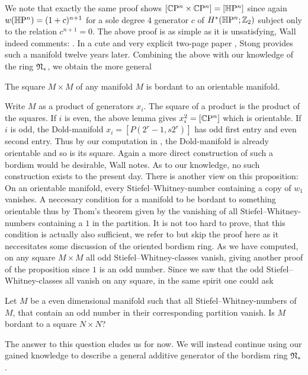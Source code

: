 \endprf
We note that exactly the same proof shows $[\mathbb{C}\mathrm{P}^n\times\mathbb{C}\mathrm{P}^n] = [\mathbb{H}\mathrm{P}^n]$ since again $w(\mathbb{H}\mathrm{P}^n) = (1 + c)^{n+1}$ for a sole degree $4$ generator $c$ of $H^\ast(\mathbb{H}\mathrm{P}^n;\mathbb{Z}_2)$ subject only to the relation $c^{n+1}=0$.
The above proof is as simple as it is unsatisfying,
Wall indeed comments:
.
In a cute and very explicit two-page paper \cite{stong:cob}, Stong provides such a manifold twelve years later.
Combining the above with our knowledge of the ring $\mathfrak{N}_\ast$, we obtain the more general
\begin{thesisprop}
    The square $M\times M$ of any manifold $M$ is bordant to an orientable manifold.
\end{thesisprop}
\prf
Write $M$ as a product of generators $x_i$.
The square of a product is the product of the squares.
If $i$ is even, the above lemma gives $x_i^2 = [\mathbb{C}\mathrm{P}^n]$ which is orientable. 
If $i$ is odd, the Dold-manifold $x_i = [P(2^r - 1, s2^r)]$ has odd first entry and even second entry.
Thus by our computation in , the Dold-manifold is already orientable and so is its square.
\endprf
Again a more direct construction of such a bordism would be desirable, Wall notes.
As to our knowledge, no such construction exists to the present day. 
There is another view on this proposition:
On an orientable manifold, every Stiefel--Whitney-number containing a copy of $w_1$ vanishes.
A neccesary condition for a manifold to be bordant to something orientable thus by Thom's theorem given by the vanishing of all Stiefel--Whitney-numbers containing a $1$ in the partition.
It is not too hard to prove, that this condition is actually also sufficient, we refer to \cite{wall:bord} but skip the proof here as it neccesitates some discussion of the oriented bordism ring.
As we have computed, on any square $M\times M$ all odd Stiefel--Whitney-classes vanish, giving another proof of the proposition since $1$ is an odd number.
Since we saw that the odd Stiefel--Whitney-classes all vanish on any square, in the same spirit one could ask
\begin{q}
    Let $M$ be a even dimensional manifold such that all Stiefel--Whitney-numbers of $M$, that contain an odd number in their corresponding partition vanish.
    Is $M$ bordant to a square $N\times N$?
\end{q}\noindent{}
The answer to this question eludes us for now.
We will instead continue using our gained knowledge to describe a general additive generator of the bordism ring $\mathfrak{N}_\ast$.
